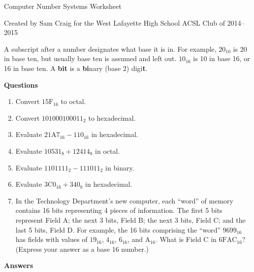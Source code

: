 \documentclass[12pt,letterpaper,fleqn]{article}
\begin{document}
\begin{center}
  Computer Number Systems Worksheet

  Created by Sam Craig for the West Lafayette High School ACSL Club of 2014--2015
\end{center}

A subscript after a number designates what base it is in.
For example, $20_{10}$ is 20 in base ten, but usually base ten is assumed and left out.
$10_{16}$ is 10 in base 16, or 16 in base ten.
A \textbf{bit} is a \textbf{bi}nary (base 2) digi\textbf{t}.

\bigskip
\noindent \textbf{Questions}

\begin{enumerate}

\item Convert $15\text{F}_{16}$ to octal.

\item Convert $101000100011_2$ to hexadecimal.

\item Evaluate $21\text{A}7_{16} - 110_{16}$ in hexadecimal.

\item Evaluate $10531_8 + 12414_8$ in octal.

\item Evaluate $1101111_2 - 111011_2$ in binary.

\item Evaluate $3\text{C}0_{16} + 340_8$ in hexadecimal.

\item In the Technology Department's new computer, each ``word'' of memory
  contains 16 bits representing 4 pieces of information.
  The first 5 bits represent Field A; the next
  3 bits, Field B; the next 3 bits, Field C;
  and the last 5 bits, Field D.
  For example, the 16 bits comprising the ``word''
  $9699_{16}$ has fields with values of $19_{16}$, $4_{16}$,
  $6_{16}$, and $\text{A}_{16}$. What is Field C in $6\text{FAC}_{16}$? (Express your answer as
  a base 16 number.)

\end{enumerate}

\pagebreak

\noindent \textbf{Answers}
\end{document}
